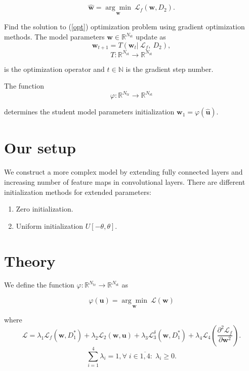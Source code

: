 \documentclass[80pt]{article}
\begin{document}
\begin{equation}\label{opt}
    \hat{\mathbf{w}} =  \underset{\mathbf{w}}{\arg\min}~\mathcal{L}_f(\mathbf{w}, D_2).
\end{equation}

Find the solution to (\ref{opt}) optimization problem using gradient optimization methods. The model parameters $\mathbf{w} \in \mathbb{R}^{N_{\text{st}}}$ update as
\[\mathbf{w}_{t+1} = T(\mathbf{w}_t |~\mathcal{L}_f,~D_2),\]
\[T: \mathbb{R}^{N_\text{st}} \rightarrow \mathbb{R}^{N_\text{st}}\]

is the optimization operator and $t \in \mathbb{N}$ is the gradient step number.

The function 
\[\varphi: \mathbb{R}^{N_\text{tr}} \rightarrow \mathbb{R}^{N_\text{st}}\]

determines the student model parameters initialization $\mathbf{w}_1 = \varphi(\hat{\mathbf{u}})$.

\section{Our setup}
\label{sec:setup}

We construct a more complex model by extending fully connected layers and increasing number of feature maps in convolutional layers. There are different initialization methods for extended parameters:

\begin{enumerate}
    \item Zero initialization.
    \item Uniform initialization $U[-\theta, \theta]$.
\end{enumerate}

\section{Theory}

We define the function $\varphi: \mathbb{R}^{N_\text{tr}} \rightarrow \mathbb{R}^{N_\text{st}}$ as

\begin{equation}\label{phi}
  \varphi(\mathbf{u}) = \underset{\mathbf{w}}{\arg\min}~\mathcal{L}(\mathbf{w})
\end{equation}

where \[\mathcal{L} = \lambda_1 \mathcal{L}_f(\mathbf{w}, D_1^*) + \lambda_2 \mathcal{L}_2 (\mathbf{w}, \mathbf{u}) + \lambda_3 \mathcal{L}_3^\delta (\mathbf{w}, D_1^*) + \lambda_4 \mathcal{L}_4 \left(\displaystyle \frac{\partial^2 \mathcal{L}_f}{\partial \mathbf{w}^2}\right).\]
\[\sum\limits_{i=1}^4 \lambda_i =1, \forall\; i \in \overline{1, 4}:\; \lambda_i \ge 0.\]
\end{document}
